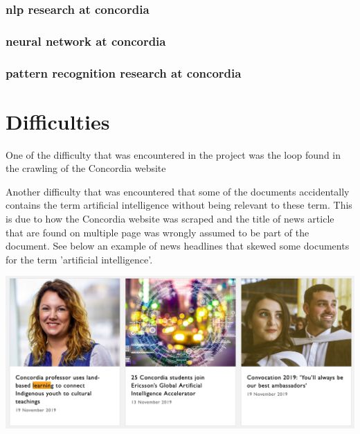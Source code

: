 \subsection{nlp research at concordia}

\subsection{neural network at concordia}

\subsection{pattern recognition research at concordia}

\chapter{Difficulties}

\par One of the difficulty that was encountered in the project was the loop found in the crawling of the Concordia website
\par Another difficulty that was encountered that some of the documents accidentally contains the term artificial intelligence without being relevant to these term. This is due to how the Concordia website was scraped and the title of news article that are found on multiple page was wrongly assumed to be part of the document. See below an example of news headlines that skewed some documents for the term 'artificial intelligence'.
\begin{center}
    \includegraphics[width=\textwidth]{difficulty1.png}
\end{center}

